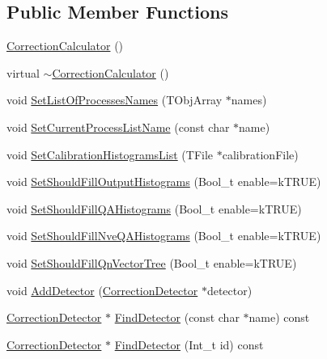\subsection*{Public Member Functions}
\begin{DoxyCompactItemize}
\item 
\mbox{\hyperlink{classQn_1_1CorrectionCalculator_a66db1979cc23ca81e8cace68d816f8c3}{Correction\+Calculator}} ()
\item 
virtual \mbox{\hyperlink{classQn_1_1CorrectionCalculator_a52d30901588086ead7400efffcc56c98}{$\sim$\+Correction\+Calculator}} ()
\item 
void \mbox{\hyperlink{classQn_1_1CorrectionCalculator_ac0ad939e7fbdcb80c6b2ee08fc7d3447}{Set\+List\+Of\+Processes\+Names}} (T\+Obj\+Array $\ast$names)
\item 
void \mbox{\hyperlink{classQn_1_1CorrectionCalculator_a74c96c14696e8221ec839d7c8b5f773b}{Set\+Current\+Process\+List\+Name}} (const char $\ast$name)
\item 
void \mbox{\hyperlink{classQn_1_1CorrectionCalculator_a62057548ca452e31e76ff98c9e5b6fd0}{Set\+Calibration\+Histograms\+List}} (T\+File $\ast$calibration\+File)
\item 
void \mbox{\hyperlink{classQn_1_1CorrectionCalculator_a00dfda0d66bfdeeec6497580e491774a}{Set\+Should\+Fill\+Output\+Histograms}} (Bool\+\_\+t enable=k\+T\+R\+UE)
\item 
void \mbox{\hyperlink{classQn_1_1CorrectionCalculator_a598ddf62e8f05b71bf3e5c573a4af6c2}{Set\+Should\+Fill\+Q\+A\+Histograms}} (Bool\+\_\+t enable=k\+T\+R\+UE)
\item 
void \mbox{\hyperlink{classQn_1_1CorrectionCalculator_a97f032c649755a11b88f919dbb02c717}{Set\+Should\+Fill\+Nve\+Q\+A\+Histograms}} (Bool\+\_\+t enable=k\+T\+R\+UE)
\item 
void \mbox{\hyperlink{classQn_1_1CorrectionCalculator_abfa3d7424b677f225d2e7c4f37d70e8a}{Set\+Should\+Fill\+Qn\+Vector\+Tree}} (Bool\+\_\+t enable=k\+T\+R\+UE)
\item 
void \mbox{\hyperlink{classQn_1_1CorrectionCalculator_a31d52031dbe77275dc0c6fea04675464}{Add\+Detector}} (\mbox{\hyperlink{classQn_1_1CorrectionDetector}{Correction\+Detector}} $\ast$detector)
\item 
\mbox{\hyperlink{classQn_1_1CorrectionDetector}{Correction\+Detector}} $\ast$ \mbox{\hyperlink{classQn_1_1CorrectionCalculator_a424e42bfb3c9d9591463c41644c9f6f6}{Find\+Detector}} (const char $\ast$name) const
\item 
\mbox{\hyperlink{classQn_1_1CorrectionDetector}{Correction\+Detector}} $\ast$ \mbox{\hyperlink{classQn_1_1CorrectionCalculator_affd2bd5b4eb73289f03356c3246dfeb3}{Find\+Detector}} (Int\+\_\+t id) const

\end{DoxyCompactItemize}
